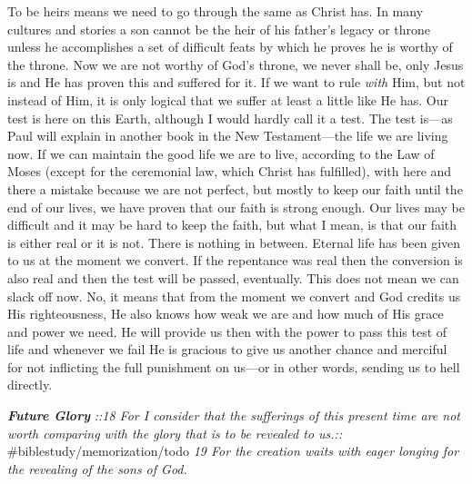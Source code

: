 To be heirs means we need to go through the same as Christ has. In many
cultures and stories a son cannot be the heir of his father's legacy or
throne unless he accomplishes a set of difficult feats by which he
proves he is worthy of the throne. Now we are not worthy of God's
throne, we never shall be, only Jesus is and He has proven this and
suffered for it. If we want to rule \emph{with} Him, but not instead of
Him, it is only logical that we suffer at least a little like He has.
Our test is here on this Earth, although I would hardly call it a test.
The test is---as Paul will explain in another book in the New
Testament---the life we are living now. If we can maintain the good life
we are to live, according to the Law of Moses (except for the ceremonial
law, which Christ has fulfilled), with here and there a mistake because
we are not perfect, but mostly to keep our faith until the end of our
lives, we have proven that our faith is strong enough. Our lives may be
difficult and it may be hard to keep the faith, but what I mean, is that
our faith is either real or it is not. There is nothing in between.
Eternal life has been given to us at the moment we convert. If the
repentance was real then the conversion is also real and then the test
will be passed, eventually. This does not mean we can slack off now. No,
it means that from the moment we convert and God credits us His
righteousness, He also knows how weak we are and how much of His grace
and power we need. He will provide us then with the power to pass this
test of life and whenever we fail He is gracious to give us another
chance and merciful for not inflicting the full punishment on us---or in
other words, sending us to hell directly.

\textbf{\emph{Future Glory}} \emph{::18 For I consider that the
sufferings of this present time are not worth comparing with the glory
that is to be revealed to us.::} \#biblestudy/memorization/todo \emph{19
For the creation waits with eager longing for the revealing of the sons
of God.}

